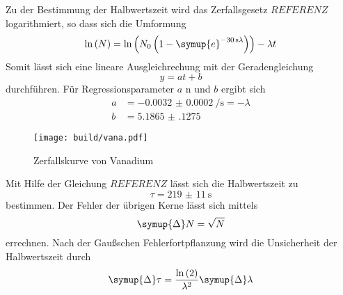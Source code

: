 Zu der Bestimmung der Halbwertszeit wird das Zerfallsgesetz $REFERENZ$ logarithmiert, so dass sich die Umformung
\begin{equation}
\ln \left (N \right ) = \ln \left (N_0 \left (1-\symup{e}^{\SI{-30}{\second} \lambda} \right ) \right )   - \lambda t 
\end{equation}
Somit lässt sich eine lineare Ausgleichrechung mit der Geradengleichung
\begin{equation}
    y = at + b 
\end{equation}
durchführen. 
Für Regressionsparameter $a$ n und $b$ ergibt sich
\begin{align*}
    a &= \SI{-0.0032(2)}{\per\second} = - \lambda\\
    b &= \num{5.1865(1275)}
\end{align*}
\begin{figure}
    \centering
    \caption{Zerfallskurve von Vanadium}
    \label{fig:vana}
    \texttt{[image: build/vana.pdf]}
\end{figure}
Mit Hilfe der Gleichung $REFERENZ$ lässt sich die Halbwertszeit zu
\begin{equation*}
\tau = \SI{219(11)}{\second}
\end{equation*}
bestimmen.
Der Fehler der übrigen Kerne lässt sich mittels
\begin{equation}
    \symup{\Delta} N = \sqrt{N} 
\end{equation}
errechnen.
Nach der Gaußschen Fehlerfortpflanzung wird die Unsicherheit der Halbwertszeit durch
\begin{equation}
    \symup{\Delta} \tau = \frac{\ln \left (2 \right )}{\lambda^2} \symup{\Delta} \lambda
\end{equation}

